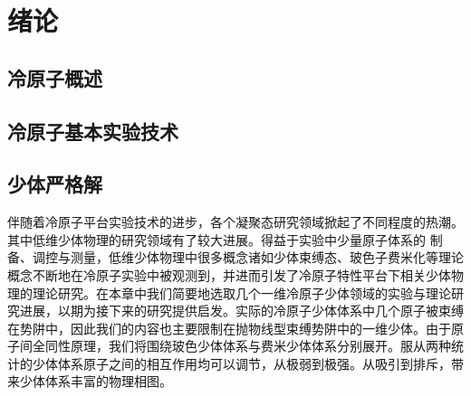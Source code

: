 \chapter{绪论}\label{chap:kondo}

\section{冷原子概述}


\section{冷原子基本实验技术}

\section{少体严格解}\label{sec:fewbody}

伴随着冷原子平台实验技术的进步，各个凝聚态研究领域掀起了不同程度的热潮。其中低维少体物理的研究领域有了较大进展。得益于实验中少量原子体系的
制备、调控与测量，低维少体物理中很多概念诸如少体束缚态、玻色子费米化等理论概念不断地在冷原子实验中被观测到，并进而引发了冷原子特性平台下相关少体物理的理论研究。在本章中我们简要地选取几个一维冷原子少体领域的实验与理论研究进展，以期为接下来的研究提供启发。实际的冷原子少体体系中几个原子被束缚在势阱中，因此我们的内容也主要限制在抛物线型束缚势阱中的一维少体。由于原子间全同性原理，我们将围绕玻色少体体系与费米少体体系分别展开。服从两种统计的少体体系原子之间的相互作用均可以调节，从极弱到极强。从吸引到排斥，带来少体体系丰富的物理相图。


